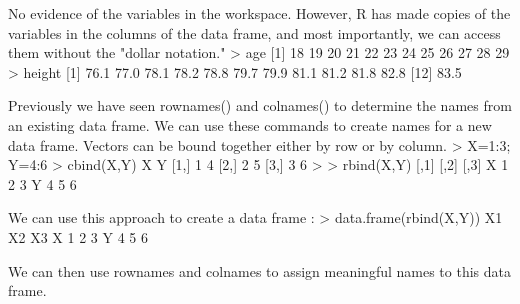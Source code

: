No evidence of the variables in the workspace. However, R has made copies of the variables in the columns of the data frame, and most importantly, we can access them without the "dollar notation."
> age
 [1] 18 19 20 21 22 23 24 25 26 27 28 29
> height
 [1] 76.1 77.0 78.1 78.2 78.8 79.7 79.9 81.1 81.2 81.8 82.8
[12] 83.5


Previously we have seen rownames() and colnames() to determine the names from an existing data frame. We can use these commands to create names for a new data frame.
Vectors can be bound together either by row or by column.
> X=1:3; Y=4:6
> cbind(X,Y)
     X Y
[1,] 1 4
[2,] 2 5
[3,] 3 6
>
> rbind(X,Y)
  [,1] [,2] [,3]
X    1    2    3
Y    4    5    6


We can use this approach to create a data frame :
> data.frame(rbind(X,Y))
  X1 X2 X3
X  1  2  3
Y  4  5  6

We can then use rownames and colnames to assign meaningful names to this data frame.
